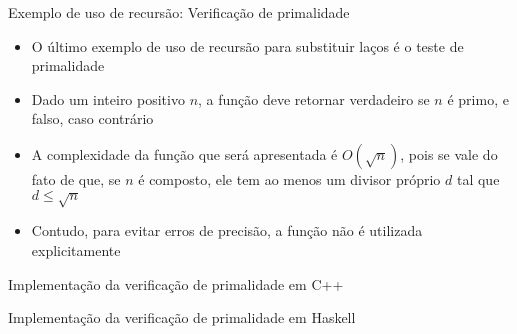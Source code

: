 \begin{frame}[fragile]{Exemplo de uso de recursão: Verificação de primalidade}

    \begin{itemize}
        \item O último exemplo de uso de recursão para substituir laços é o teste de
            primalidade

        \item Dado um inteiro positivo $n$, a função  deve
            retornar verdadeiro se $n$ é primo, e falso, caso contrário

        \item A complexidade da função que será apresentada é $O(\sqrt{n})$, pois se vale do
            fato de que, se $n$ é composto, ele tem ao menos um divisor próprio $d$ tal que
            $d \leq \sqrt{n}$

        \item Contudo, para evitar erros de precisão, a função  não é 
            utilizada explicitamente
    \end{itemize}

\end{frame}

\begin{frame}[fragile]{Implementação da verificação de primalidade em C++}
\end{frame}

\begin{frame}[fragile]{Implementação da verificação de primalidade em Haskell}
\end{frame}

